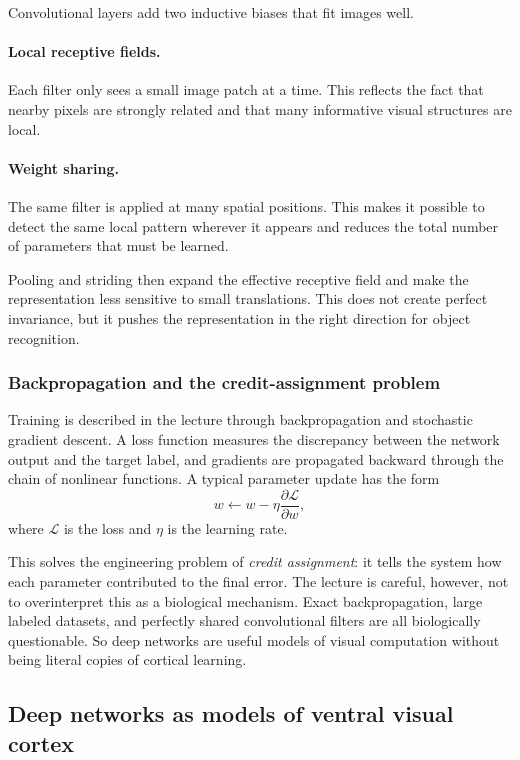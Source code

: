 Convolutional layers add two inductive biases that fit images well.

\paragraph{Local receptive fields.}
Each filter only sees a small image patch at a time. This reflects the fact that nearby pixels are strongly related and that many informative visual structures are local.

\paragraph{Weight sharing.}
The same filter is applied at many spatial positions. This makes it possible to detect the same local pattern wherever it appears and reduces the total number of parameters that must be learned.

Pooling and striding then expand the effective receptive field and make the representation less sensitive to small translations. This does not create perfect invariance, but it pushes the representation in the right direction for object recognition.

\subsubsection{Backpropagation and the credit-assignment problem}

Training is described in the lecture through backpropagation and stochastic gradient descent. A loss function measures the discrepancy between the network output and the target label, and gradients are propagated backward through the chain of nonlinear functions. A typical parameter update has the form
\[
w \leftarrow w - \eta \frac{\partial \mathcal{L}}{\partial w},
\]
where \(\mathcal{L}\) is the loss and \(\eta\) is the learning rate.

This solves the engineering problem of \emph{credit assignment}: it tells the system how each parameter contributed to the final error. The lecture is careful, however, not to overinterpret this as a biological mechanism. Exact backpropagation, large labeled datasets, and perfectly shared convolutional filters are all biologically questionable. So deep networks are useful models of visual computation without being literal copies of cortical learning.

\subsection{Deep networks as models of ventral visual cortex}

